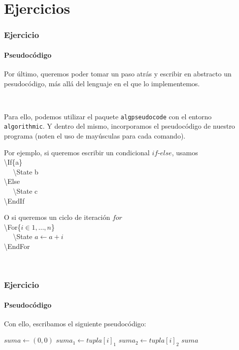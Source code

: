 \section{Ejercicios}\label{ejercicios}

\begin{frame}
\frametitle{Ejercicio}
\framesubtitle{Pseudocódigo}

Por último, queremos poder tomar un paso atrás y escribir en abstracto un pesudocódigo, más allá del lenguaje en el que lo implementemos.

\

Para ello, podemos utilizar el \textcolor{codeorange}{paquete} \texttt{algpseudocode} con el \textcolor{codeorange}{entorno} \texttt{algorithmic}. Y dentro del mismo, incorporamos el pseudocódigo de nuestro programa (noten el uso de mayúsculas para cada comando).

\begin{multicols}{2}

Por ejemplo, si queremos escribir un condicional $if$-$else$, usamos \\

\textbackslash If\{a\} \\
$~~~~~~$\textbackslash State b \\
\textbackslash Else \\
$~~~~~~$\textbackslash State c \\
\textbackslash EndIf \\

\pause

O si queremos un ciclo de iteración $for$ \\

\textbackslash For\{$i \in 1,\ldots,n$\} \\
$~~~~~~$\textbackslash State $a \gets a + i$ \\
\textbackslash EndFor

\

\end{multicols}
\end{frame}

\begin{frame}
\frametitle{Ejercicio}
\framesubtitle{Pseudocódigo}

Con ello, escribamos el siguiente pseudocódigo:

\begin{tcolorbox}[colframe=color1]
\begin{center}
\begin{algorithmic}
        \State $suma \gets (0,0)$
            \State $suma_1 \gets tupla[i]_1$
            \State $suma_2 \gets tupla[i]_2$
        \EndFor
        \EndIf
        \State \Return $suma$
    \EndFunction
\end{algorithmic}
\end{center}
\end{tcolorbox}

\end{frame}